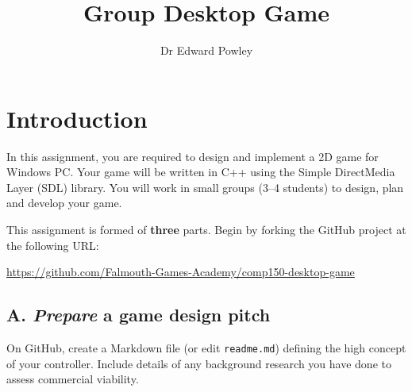 \documentclass{../fal_assignment}
\title{Group Desktop Game}
\author{Dr Edward Powley}
\begin{document}
\maketitle
%    
\section*{Introduction}

In this assignment, you are required to design and implement a 2D game for Windows PC.
Your game will be written in C++ using the Simple DirectMedia Layer (SDL) library.
You will work in small groups (3--4 students) to design, plan and develop your game.


This assignment is formed of \textbf{three} parts.
Begin by forking the GitHub project at the following URL:
\begin{center}
\url{https://github.com/Falmouth-Games-Academy/comp150-desktop-game}
\end{center}

\subsection*{A. \emph{Prepare} a game design pitch}

On GitHub, create a Markdown file (or edit \texttt{readme.md})
defining the high concept of your controller.
Include details of any background research you have done to assess commercial viability.
\end{document}
